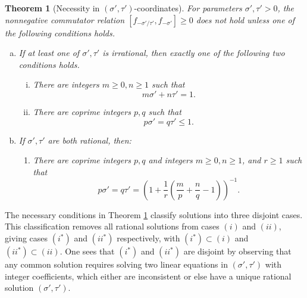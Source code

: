\documentclass[11pt, letterpaper, reqno]{amsart}
\newtheorem{thm}{Theorem}[section]
\theoremstyle{definition}
\theoremstyle{remark}
\numberwithin{equation}{section}
\newcommand{\tbetap}{{\sigma'}}
\newcommand{\trhop}{{\tau'}}
\begin{document}
\begin{thm}[Necessity in $(\tbetap, \trhop)$-coordinates]
\label{thm:neg-necessary}
For parameters $\tbetap, \trhop>0$, 
the nonnegative commutator relation ${ [f_{-\tbetap/\trhop}, f_{-\tbetap}] \geq 0 }$
does not hold unless one of the following conditions holds.

\begin{enumerate}[(a)]
\item
 If at least one of $\tbetap, \trhop$ is irrational, then  exactly one of the following two conditions holds.
\begin{enumerate}[(i)]
\item[$(i^{\ast})$] \label{it:hyperbola}
There are integers $m \geq 0,n\geq 1$ such that
\begin{equation*}
{m}\tbetap + {n}\trhop = 1.
\end{equation*}

\item[$(ii^{\ast})$] \label{it:line}
There are coprime integers $p,q$ such that
\begin{equation*}
p{\tbetap} = q{\trhop} \leq 1.
\end{equation*}

\end{enumerate}
\item If   $\tbetap, \trhop$ are both rational,
then: 
\begin{enumerate}
\item[(iii*)]
There are coprime integers $p,q$ and integers $m\geq 0, n\geq1$, and $r\geq 1$ such that
\begin{equation*}
{p}\tbetap = {q}\trhop = \left(1 + \frac{1}{r} \left( \frac{m}{p} + \frac{n}{q}-1\right)\right)^{-1}.
\end{equation*}
\end{enumerate}
\end{enumerate}
\end{thm}


The necessary conditions   in Theorem \ref{thm:neg-necessary}
 classify solutions into  three disjoint cases. 
This classification removes all rational solutions from cases $(i)$ and $(ii)$,
 giving cases $(i^{\ast})$ and $(ii^{\ast})$ respectively, with $(i^{\ast}) \subset (i)$ and $(ii^{\ast}) \subset (ii)$. 
One sees that $(i^{\ast})$  and $(ii^{\ast})$  are disjoint by  observing
that any common solution requires  solving  two linear equations in $(\tbetap, \trhop)$ with integer 
coefficients,
which  either are inconsistent or else have a
unique rational solution $(\tbetap, \trhop)$. 
\end{document}
